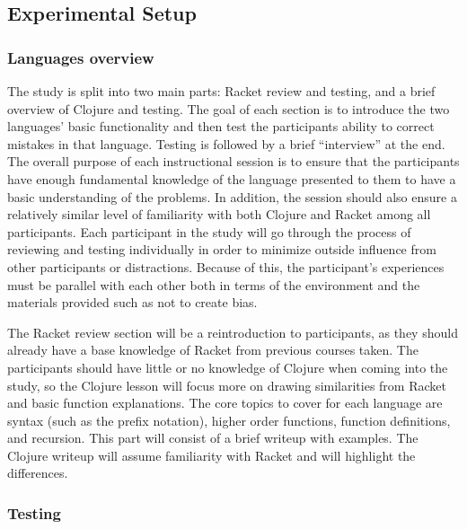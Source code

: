 \documentclass[submission,copyright,creativecommons]{eptcs}
\newcommand{\allcomments}[1]{{#1}}
\newcommand{\thcomment}[1]{{\bf \textcolor{blue}{\allcomments{{#1}}}}}
\begin{document}
	\subsection{Experimental Setup}\label{sec:setup}
	
	   


\subsubsection{Languages overview}\label{subsec:overview}

The study is split into two main parts: Racket review and testing, and a brief overview of Clojure and testing.
The goal of each section is to introduce the two languages' basic functionality and then test the participants ability to correct mistakes in that language.
Testing is followed by a brief ``interview'' at the end. 
The overall purpose of each instructional session is to ensure that the participants have enough fundamental knowledge of the language presented to them to have a basic understanding of the problems. 
In addition, the session should also ensure a relatively similar level of familiarity with both Clojure and Racket among all participants. 
Each participant in the study will go through the process of reviewing and testing individually in order to minimize outside influence from other participants or distractions. 
Because of this, the participant's experiences must be parallel with each other both in terms of the environment and the materials provided such as not to create bias.

The Racket review section will be a reintroduction to participants, as they should already have a base knowledge of Racket from previous courses taken.
The participants should have little or no knowledge of Clojure when coming into the study, so the Clojure lesson will focus more on drawing similarities from Racket and basic function explanations.
The core topics to cover for each language are syntax (such as the prefix notation), higher order functions, function definitions, and recursion.
This part will consist of a brief writeup with examples. The Clojure writeup will assume familiarity with Racket and will highlight the differences. 

\subsubsection{Testing}\label{subsec:testing}
\end{document}
